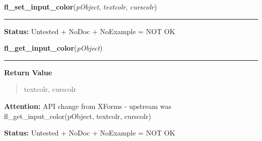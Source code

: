     \label{xformslib:library:fl_set_input_color}

    \vspace{0.5ex}

\hspace{.8\funcindent}\begin{boxedminipage}{\funcwidth}

    \raggedright \textbf{fl\_set\_input\_color}(\textit{pObject}, \textit{textcolr}, \textit{curscolr})

    \vspace{-1.5ex}

    \rule{\textwidth}{0.5\fboxrule}
\setlength{\parskip}{2ex}
\setlength{\parskip}{1ex}
\textbf{Status:} Untested + NoDoc + NoExample = NOT OK



    \end{boxedminipage}

    \label{xformslib:library:fl_get_input_color}

    \vspace{0.5ex}

\hspace{.8\funcindent}\begin{boxedminipage}{\funcwidth}

    \raggedright \textbf{fl\_get\_input\_color}(\textit{pObject})

    \vspace{-1.5ex}

    \rule{\textwidth}{0.5\fboxrule}
\setlength{\parskip}{2ex}
\setlength{\parskip}{1ex}
      \textbf{Return Value}
    \vspace{-1ex}

      \begin{quote}
      textcolr, curscolr

      \end{quote}

\textbf{Attention:} API change from XForms - upstream was fl\_get\_input\_color(pObject, 
textcolr, curscolr)



\textbf{Status:} Untested + NoDoc + NoExample = NOT OK



    \end{boxedminipage}


